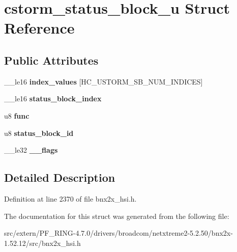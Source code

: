 \hypertarget{structcstorm__status__block__u}{
\section{cstorm\_\-status\_\-block\_\-u Struct Reference}
\label{structcstorm__status__block__u}
}
\subsection*{Public Attributes}
\begin{DoxyCompactItemize}
\item 
\hypertarget{structcstorm__status__block__u_a36e071df4092710e19b042d1d884623e}{
\_\-\_\-le16 {\bfseries index\_\-values} \mbox{[}HC\_\-USTORM\_\-SB\_\-NUM\_\-INDICES\mbox{]}}
\label{structcstorm__status__block__u_a36e071df4092710e19b042d1d884623e}

\item 
\hypertarget{structcstorm__status__block__u_ab893e88d8075d7d80e0d69e85a79d821}{
\_\-\_\-le16 {\bfseries status\_\-block\_\-index}}
\label{structcstorm__status__block__u_ab893e88d8075d7d80e0d69e85a79d821}

\item 
\hypertarget{structcstorm__status__block__u_a6cdc01b100b9dc14ff65defa92f9b4f4}{
u8 {\bfseries func}}
\label{structcstorm__status__block__u_a6cdc01b100b9dc14ff65defa92f9b4f4}

\item 
\hypertarget{structcstorm__status__block__u_a859e66422fbe1818670dfee5aeee4080}{
u8 {\bfseries status\_\-block\_\-id}}
\label{structcstorm__status__block__u_a859e66422fbe1818670dfee5aeee4080}

\item 
\hypertarget{structcstorm__status__block__u_a385ebf52f804e6bb6a66f466edba3ea1}{
\_\-\_\-le32 {\bfseries \_\-\_\-flags}}
\label{structcstorm__status__block__u_a385ebf52f804e6bb6a66f466edba3ea1}

\end{DoxyCompactItemize}


\subsection{Detailed Description}


Definition at line 2370 of file bnx2x\_\-hsi.h.



The documentation for this struct was generated from the following file:\begin{DoxyCompactItemize}
\item 
src/extern/PF\_\-RING-\/4.7.0/drivers/broadcom/netxtreme2-\/5.2.50/bnx2x-\/1.52.12/src/bnx2x\_\-hsi.h\end{DoxyCompactItemize}
